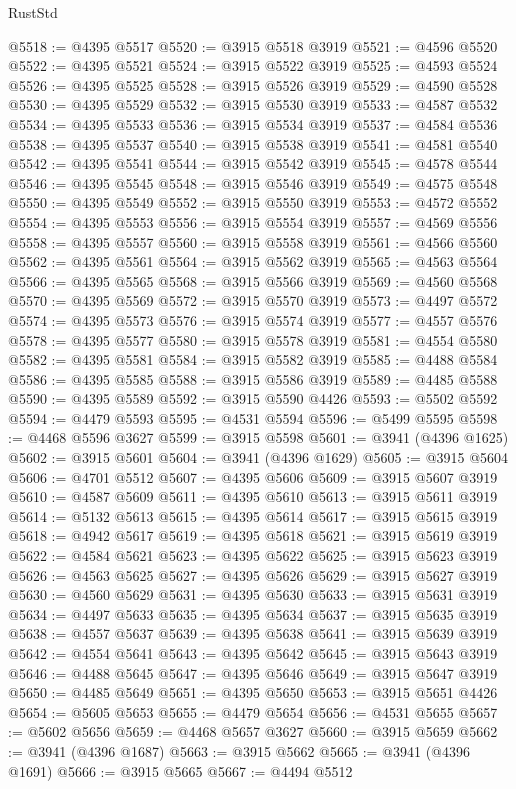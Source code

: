 \begin{lexlean}{RustStd}
\begin{coremodule}
@5518 := @4395 @5517
@5520 := @3915 @5518 @3919
@5521 := @4596 @5520
@5522 := @4395 @5521
@5524 := @3915 @5522 @3919
@5525 := @4593 @5524
@5526 := @4395 @5525
@5528 := @3915 @5526 @3919
@5529 := @4590 @5528
@5530 := @4395 @5529
@5532 := @3915 @5530 @3919
@5533 := @4587 @5532
@5534 := @4395 @5533
@5536 := @3915 @5534 @3919
@5537 := @4584 @5536
@5538 := @4395 @5537
@5540 := @3915 @5538 @3919
@5541 := @4581 @5540
@5542 := @4395 @5541
@5544 := @3915 @5542 @3919
@5545 := @4578 @5544
@5546 := @4395 @5545
@5548 := @3915 @5546 @3919
@5549 := @4575 @5548
@5550 := @4395 @5549
@5552 := @3915 @5550 @3919
@5553 := @4572 @5552
@5554 := @4395 @5553
@5556 := @3915 @5554 @3919
@5557 := @4569 @5556
@5558 := @4395 @5557
@5560 := @3915 @5558 @3919
@5561 := @4566 @5560
@5562 := @4395 @5561
@5564 := @3915 @5562 @3919
@5565 := @4563 @5564
@5566 := @4395 @5565
@5568 := @3915 @5566 @3919
@5569 := @4560 @5568
@5570 := @4395 @5569
@5572 := @3915 @5570 @3919
@5573 := @4497 @5572
@5574 := @4395 @5573
@5576 := @3915 @5574 @3919
@5577 := @4557 @5576
@5578 := @4395 @5577
@5580 := @3915 @5578 @3919
@5581 := @4554 @5580
@5582 := @4395 @5581
@5584 := @3915 @5582 @3919
@5585 := @4488 @5584
@5586 := @4395 @5585
@5588 := @3915 @5586 @3919
@5589 := @4485 @5588
@5590 := @4395 @5589
@5592 := @3915 @5590 @4426
@5593 := @5502 @5592
@5594 := @4479 @5593
@5595 := @4531 @5594
@5596 := @5499 @5595
@5598 := @4468 @5596 @3627
@5599 := @3915 @5598
@5601 := @3941 (@4396 @1625)
@5602 := @3915 @5601
@5604 := @3941 (@4396 @1629)
@5605 := @3915 @5604
@5606 := @4701 @5512
@5607 := @4395 @5606
@5609 := @3915 @5607 @3919
@5610 := @4587 @5609
@5611 := @4395 @5610
@5613 := @3915 @5611 @3919
@5614 := @5132 @5613
@5615 := @4395 @5614
@5617 := @3915 @5615 @3919
@5618 := @4942 @5617
@5619 := @4395 @5618
@5621 := @3915 @5619 @3919
@5622 := @4584 @5621
@5623 := @4395 @5622
@5625 := @3915 @5623 @3919
@5626 := @4563 @5625
@5627 := @4395 @5626
@5629 := @3915 @5627 @3919
@5630 := @4560 @5629
@5631 := @4395 @5630
@5633 := @3915 @5631 @3919
@5634 := @4497 @5633
@5635 := @4395 @5634
@5637 := @3915 @5635 @3919
@5638 := @4557 @5637
@5639 := @4395 @5638
@5641 := @3915 @5639 @3919
@5642 := @4554 @5641
@5643 := @4395 @5642
@5645 := @3915 @5643 @3919
@5646 := @4488 @5645
@5647 := @4395 @5646
@5649 := @3915 @5647 @3919
@5650 := @4485 @5649
@5651 := @4395 @5650
@5653 := @3915 @5651 @4426
@5654 := @5605 @5653
@5655 := @4479 @5654
@5656 := @4531 @5655
@5657 := @5602 @5656
@5659 := @4468 @5657 @3627
@5660 := @3915 @5659
@5662 := @3941 (@4396 @1687)
@5663 := @3915 @5662
@5665 := @3941 (@4396 @1691)
@5666 := @3915 @5665
@5667 := @4494 @5512

\end{coremodule}
\end{lexlean}
